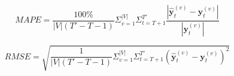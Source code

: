 \documentclass[
]{article}
\begin{document}
\begin{equation}\label{mape}
    MAPE = \frac{100\%}{|V|(T'-T-1)}\Sigma_{v=1}^{|V|} \Sigma_{t=T+1}^{T'} \frac{ | \bm{\hat{y}}^{(v)}_{t} - \bm{y}_{t}^{(v)} | }{ |\bm{y}_{t}^{(v)}| }
\end{equation}

\begin{equation}\label{rmse}
    RMSE = \sqrt{ \frac{1}{|V|(T'-T-1)} \Sigma_{v=1}^{|V|} \Sigma_{t=T+1}^{T'} (\bm{\hat{y}}^{(v)}_{t} - \bm{y}_{t}^{(v)})^2 }
\end{equation}
\end{document}
